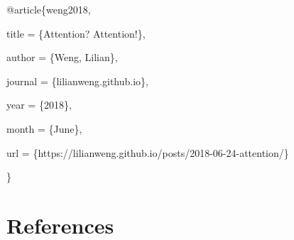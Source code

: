 \documentclass[12pt]{article}
\begin{document}
\begin{tcolorbox}[
    colback=black!5!white,
    colframe=black!80!white,
    boxrule=0.5pt,
    arc=2mm,
    left=1mm,
    right=1mm,
    top=1mm,
    bottom=1mm,
    listing only,
    listing options={
      basicstyle=\ttfamily\footnotesize,
      breaklines=true,
      literate={\{}{{\char`\{}}1 {\}}{{\char`\}}}1
    }
  ]
  @article\{weng2018,

    title   = \{Attention? Attention!\},

    author  = \{Weng, Lilian\},

    journal = \{lilianweng.github.io\},

    year    = \{2018\},

    month   = \{June\},

    url     = \{https://lilianweng.github.io/posts/2018-06-24-attention/\}

  \}
\end{tcolorbox}

\section*{References}
\end{document}
